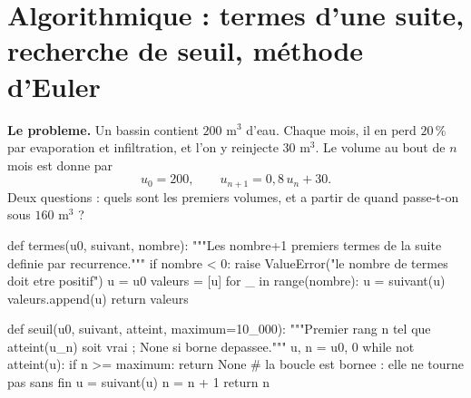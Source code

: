
\section{Algorithmique : termes d'une suite, recherche de seuil, méthode d'Euler}



\textbf{Le probleme.} Un bassin contient $200$ m$^3$ d'eau. Chaque mois, il en
perd $20\,\%$ par evaporation et infiltration, et l'on y reinjecte $30$ m$^3$.
Le volume au bout de $n$ mois est donne par
\[
  u_0 = 200,
  \qquad
  u_{n+1} = 0{,}8\,u_n + 30 .
\]
Deux questions : quels sont les premiers volumes, et a partir de quand
passe-t-on sous $160$ m$^3$ ?


\begin{python}
def termes(u0, suivant, nombre):
    """Les nombre+1 premiers termes de la suite definie par recurrence."""
    if nombre < 0:
        raise ValueError("le nombre de termes doit etre positif")
    u = u0
    valeurs = [u]
    for _ in range(nombre):
        u = suivant(u)
        valeurs.append(u)
    return valeurs

def seuil(u0, suivant, atteint, maximum=10_000):
    """Premier rang n tel que atteint(u_n) soit vrai ; None si borne depassee."""
    u, n = u0, 0
    while not atteint(u):
        if n >= maximum:
            return None          # la boucle est bornee : elle ne tourne pas sans fin
        u = suivant(u)
        n = n + 1
    return n
\end{python}

